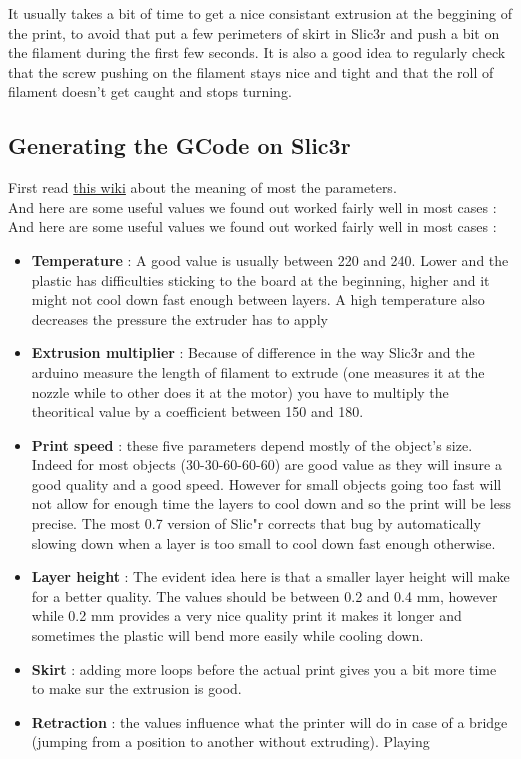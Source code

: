 \documentclass{article}
\begin{document}
It usually takes a bit of time to get a nice consistant extrusion at the beggining of the print, to avoid that put a few perimeters of skirt in Slic3r and push a bit on the filament during the first few seconds.
It is also a good idea to regularly check that the screw pushing on the filament stays nice and tight and that the roll of filament doesn't get caught and stops turning.

\subsection{Generating the GCode on Slic3r}

First read \href{http://richrap.blogspot.com/2012/01/slic3r-is-nicer-part-1-settings-and.html}{this wiki} about the meaning of most the parameters. \\

And here are some useful values we found out worked fairly well in most cases : \\

And here are some useful values we found out worked fairly well in most cases :
\begin{itemize}
\item \textbf{Temperature} : A good value is usually between 220 and 240. Lower and the plastic has difficulties sticking to the board at the beginning, higher and it might not cool down fast enough between layers. A high temperature also decreases the pressure the extruder has to apply
\item \textbf{Extrusion multiplier} : Because of difference in the way Slic3r and the arduino measure the length of filament to extrude (one measures it at the nozzle while to other does it at the motor) you have to multiply the theoritical value by a coefficient between 150 and 180.
\item \textbf{Print speed} : these five parameters depend mostly of the object's size. Indeed for most objects (30-30-60-60-60) are good value as they will insure a good quality and a good speed. However for small objects going too fast will not allow for enough time the layers to cool down and so the print will be less precise. The most 0.7 version of Slic"r corrects that bug by automatically slowing down when a layer is too small to cool down fast enough otherwise.
\item \textbf{Layer height} : The evident idea here is that a smaller layer height will make for a better quality. The values should be between 0.2 and 0.4 mm, however while 0.2 mm provides a very nice quality print it makes it longer and sometimes the plastic will bend more easily while cooling down.
\item \textbf{Skirt} : adding more loops before the actual print gives you a bit more time to make sur the extrusion is good.
\item \textbf{Retraction} : the values influence what the printer will do in case of a bridge (jumping from a position to another without extruding). Playing
\end{itemize}
\end{document}
